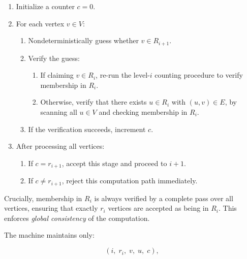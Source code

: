 \documentclass[12pt,a4paper,openany]{article}
\begin{document}
\begin{enumerate}
    \item Initialize a counter $c = 0$.
    \item For each vertex $v \in V$:
    \begin{enumerate}
        \item Nondeterministically guess whether $v \in R_{i+1}$.
        \item Verify the guess:
        \begin{enumerate}
            \item If claiming $v \in R_i$, re-run the level-$i$ counting procedure
            to verify membership in $R_i$.
            \item Otherwise, verify that there exists $u \in R_i$ with $(u,v) \in E$,
            by scanning all $u \in V$ and checking membership in $R_i$.
        \end{enumerate}
        \item If the verification succeeds, increment $c$.
    \end{enumerate}
    \item After processing all vertices:
    \begin{enumerate}
        \item If $c = r_{i+1}$, accept this stage and proceed to $i+1$.
        \item If $c \neq r_{i+1}$, reject this computation path immediately.
    \end{enumerate}
\end{enumerate}

Crucially, membership in $R_i$ is always verified by a complete pass over all vertices,
ensuring that exactly $r_i$ vertices are accepted as being in $R_i$. This enforces
\emph{global consistency} of the computation.

The machine maintains only:

\[
(i,\; r_i,\; v,\; u,\; c),
\]
\end{document}
